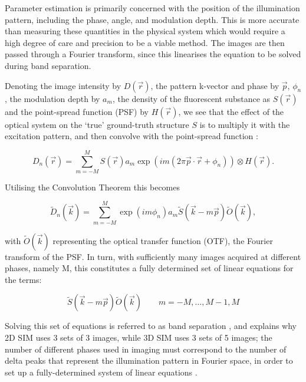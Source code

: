\documentclass[12pt]{article}
\begin{document}
Parameter estimation is primarily concerned with the position of the illumination pattern,
including the phase, angle, and modulation depth.
This is more accurate than measuring these quantities in the physical system which would require a high degree of care and precision to be a viable method.
The images are then passed through a Fourier transform,
since this linearises the equation to be solved during band separation.

Denoting the image intensity by $D(\vec{r})$, the pattern k-vector and phase by $\vec{p}$, $\phi_n$,
the modulation depth by $a_m$, the density of the fluorescent substance as $S(\vec{r})$ and the point-spread function (PSF) by $H(\vec{r})$,
we see that the effect of the optical system on the `true' ground-truth structure $S$ is to multiply it with the excitation pattern,
and then convolve with the point-spread function \cite{SIM2008}:

\[D_n(\vec{r}) = \sum_{m=-M}^{M}{S(\vec{r})a_m\exp(im(2\pi\vec{p}\cdot\vec{r}+\phi_n))\otimes H(\vec{r})}.\]

Utilising the Convolution Theorem \cite{convthm} this becomes

\[\tilde{D}_n(\vec{k}) = \sum_{m=-M}^{M}{\exp(im\phi_n)a_m\tilde{S}(\vec{k}-m\vec{p})\tilde{O}(\vec{k})},\]

with $\tilde{O}(\vec{k})$ representing the optical transfer function (OTF), the Fourier transform of the PSF.
In turn, with sufficiently many images acquired at different phases, namely M, this constitutes a fully determined set of linear equations for the terms:

\[\tilde{S}(\vec{k}-m\vec{p})\tilde{O}(\vec{k})\qquad m=-M,\dots,M-1,M\]

Solving this set of equations is referred to as band separation \cite{SIM2008},
and explains why 2D SIM uses 3 sets of 3 images, while 3D SIM uses 3 sets of 5 images;
the number of different phases used in imaging must correspond to the number of delta peaks that represent the illumination pattern in Fourier space,
in order to set up a fully-determined system of linear equations \cite{params}.
\end{document}
